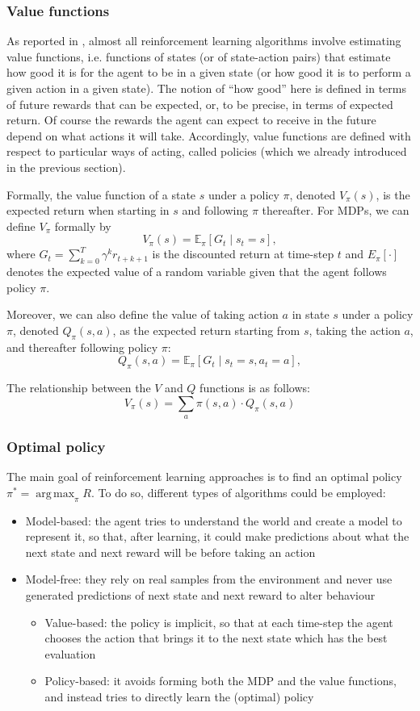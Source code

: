 \documentclass[a4paper,10pt]{report}
\DeclareMathOperator*{\argmax}{arg\,max}
\begin{document}
\subsubsection*{Value functions}
As reported in \cite{sutton-barto}, almost all reinforcement learning algorithms involve estimating value functions, i.e. functions of states (or of state-action pairs) that estimate how good it is for the agent to be in a given state (or how good it is to perform a given action in a given state). The notion of “how good” here is defined in terms of future rewards that can be expected, or, to be precise, in terms of expected return. Of course the rewards the agent can expect to receive in the future depend on what actions it will take. Accordingly, value functions are defined with respect to particular ways of acting, called policies (which we already introduced in the previous section).

Formally, the value function of a state $s$ under a policy $\pi$, denoted $V_\pi(s)$, is the expected return when starting in $s$ and following $\pi$ thereafter. For MDPs, we can define $V_\pi$ formally by
$$
V_\pi(s) = \mathbb{E}_\pi\left[G_t\mid s_t=s\right],
$$
where $G_t=\sum_{k=0}^{T}\gamma^{k}r_{t+k+1}$ is the discounted return at time-step $t$ and $E_\pi[\cdot]$ denotes the expected value of a random variable given that the agent follows policy $\pi$.

Moreover, we can also define the value of taking action $a$ in state $s$ under a policy $\pi$, denoted $Q_\pi(s,a)$, as the expected return starting from $s$, taking the action $a$, and thereafter following policy $\pi$:
$$
Q_\pi(s, a) = \mathbb{E}_\pi\left[G_t\mid s_t=s, a_t=a\right],
$$

The relationship between the $V$ and $Q$ functions is as follows:
$$
V_\pi(s)=\sum_a\pi(s,a)\cdot Q_\pi(s,a)
$$

\subsubsection*{Optimal policy}
The main goal of reinforcement learning approaches is to find an optimal policy $\pi^*=\argmax_\pi R$. To do so, different types of algorithms could be employed:
\begin{itemize}
	\item Model-based: the agent tries to understand the world and create a model to represent it, so that, after learning, it could make predictions about what the next state and next reward will be before taking an action
	\item Model-free: they rely on real samples from the environment and never use generated predictions of next state and next reward to alter behaviour
	\begin{itemize}
		\item Value-based: the policy is implicit, so that at each time-step the agent chooses the action that brings it to the next state which has the best evaluation
		\item Policy-based: it avoids forming both the MDP and the value functions, and instead tries to directly learn the (optimal) policy
	\end{itemize}
\end{itemize}
\end{document}
